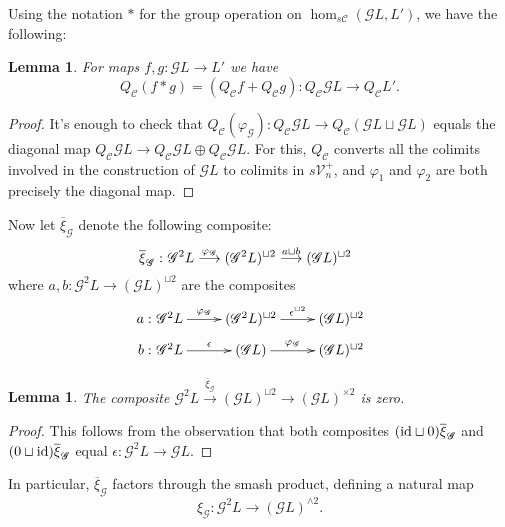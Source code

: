 \documentclass[11pt]{amsart}
\theoremstyle{plain}
\newtheorem{lem}[thm]{Lemma}
\theoremstyle{definition}
\let\phi\varphi
\renewcommand{\to}{\longrightarrow}
\newcommand{\scrQ}{\mathscr{Q}}
\newcommand{\scrR}{\mathscr{R}}
\newcommand{\scrT}{\mathscr{T}}
\newcommand{\scrY}{\mathscr{Y}}
\newcommand{\scrI}{\mathscr{I}}
\newcommand{\scrO}{\mathscr{O}}
\newcommand{\scrP}{\mathscr{P}}
\newcommand{\scrS}{\mathscr{S}}
\newcommand{\scrG}{\mathscr{G}}
\newcommand{\scrH}{\mathscr{H}}
\newcommand{\scrJ}{\mathscr{J}}
\newcommand{\scrK}{\mathscr{K}}
\newcommand{\scrL}{\mathscr{L}}
\newcommand{\scrZ}{\mathscr{Z}}
\newcommand{\scrN}{\mathscr{N}}
\newcommand{\scrM}{\mathscr{M}}
\newcommand{\calC}{\mathcal{C}}
\newcommand{\calV}{\mathcal{V}}
\theoremstyle{plain}
\newcommand{\vect}[2]{\calV^{#1}_{#2}}
\newcommand{\BSW}{{\scrG}}%
\begin{document}
\begin{Composite functor spectral sequences}
Using the notation $*$ for the group operation on $\hom_{s\calC}(\BSW L,L')$, we have the following:
\begin{lem}
For maps $f,g:\BSW L\to L'$ we have 
\[Q_{\calC}(f*g)=(Q_{\calC}f+Q_{\calC}g):Q_{\calC}\BSW L\to Q_{\calC}L'.\]
\end{lem}
\begin{proof}
It's enough to check that $Q_{\calC}(\phi_\BSW ):Q_{\calC}\BSW L\to Q_{\calC}(\BSW L\sqcup \BSW L)$ equals the diagonal map $Q_{\calC}\BSW L\to Q_{\calC}\BSW L\oplus Q_{\calC}\BSW L$. For this, $Q_{\calC}$ converts all the colimits involved in the construction of $\BSW L$ to colimits in $s\vect{+}{n}$, and $\phi_1$ and $\phi_2$ are both precisely the diagonal map.
\end{proof}

Now let $\overline{\xi}_{\BSW }$ denote the following composite:
\[\makebox[0mm][r]{$\overline{\xi}_{\BSW }:\ $}\BSW^2L\overset{\phi_{\BSW }}{\to}(\BSW^2L)^{\sqcup2}\overset{a\sqcup b}{\to}(\BSW L)^{\sqcup2}\]
where $a,b:\BSW^2L\to(\BSW L)^{\sqcup2}$ are the composites
\[\xymatrix@R=2mm{
\makebox[0mm][r]{$a:\ $}\BSW^2L\ar[r]^-{\phi_{\BSW }}
&%
(\BSW^2L)^{\sqcup2}\ar[r]^-{\epsilon^{\sqcup2}}
&%
(\BSW L)^{\sqcup2}\\
\makebox[0mm][r]{$b:\ $}\BSW^2L\ar[r]^-{\epsilon}
&%
(\BSW L)\ar[r]^-{\phi_{\BSW }}
&%
(\BSW L)^{\sqcup2}
}\]
\begin{lem}
The composite 
$\BSW^2L\overset{\overline{\xi}_{\BSW }}{\to}(\BSW L)^{\sqcup2}\to(\BSW L)^{\times2}$ is zero.
\end{lem}
\begin{proof}
This follows from the observation that both composites $(\textup{id}\sqcup0)\overline{\xi}_{\BSW }$ and $(0\sqcup\textup{id})\overline{\xi}_{\BSW }$ equal $\epsilon:\BSW^2L\to \BSW L$.
\end{proof}
In particular, $\overline{\xi}_{\BSW }$ factors through the smash product, defining a natural map
\[\xi_{\BSW }:\BSW^2L\to (\BSW L)^{\wedge 2}.\]


\end{Composite functor spectral sequences}
\end{document}

